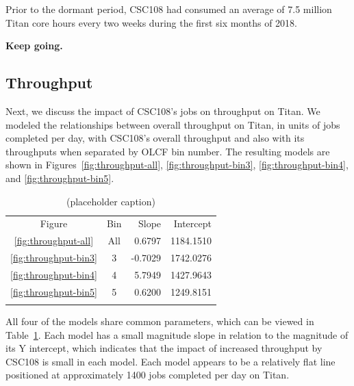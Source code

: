 Prior to the dormant period, CSC108 had consumed an average of 7.5 million
Titan core hours every two weeks during the first six months of 2018.



\textbf{Keep going.}


\subsection{Throughput}
\label{subsec:throughput}


Next, we discuss the impact of CSC108's jobs on throughput on Titan. We modeled
the relationships between overall throughput on Titan, in units of jobs
completed per day, with CSC108's overall throughput and also with its
throughputs when separated by OLCF bin number. The resulting models are shown
in Figures~\ref{fig:throughput-all}, \ref{fig:throughput-bin3},
\ref{fig:throughput-bin4}, and \ref{fig:throughput-bin5}.

\begin{table}
\caption{(placeholder caption)}
\label{tab:throughput-params}       %
\begin{tabular}{ccrr}
\hline\noalign{\smallskip}
Figure  &   Bin & Slope   & Intercept   \\
\noalign{\smallskip}\hline\noalign{\smallskip}
\ref{fig:throughput-all}    &   All &   0.6797  &   1184.1510   \\
\ref{fig:throughput-bin3}   &   3   &  -0.7029  &   1742.0276   \\
\ref{fig:throughput-bin4}   &   4   &   5.7949  &   1427.9643   \\
\ref{fig:throughput-bin5}   &   5   &   0.6200  &   1249.8151   \\
\noalign{\smallskip}\hline
\end{tabular}
\end{table}

All four of the models share common parameters, which can be viewed in
Table~\ref{tab:throughput-params}. Each model has a small magnitude slope in
relation to the magnitude of its Y intercept, which indicates that the impact
of increased throughput by CSC108 is small in each model. Each model appears to
be a relatively flat line positioned at approximately 1400 jobs completed per
day on Titan.

